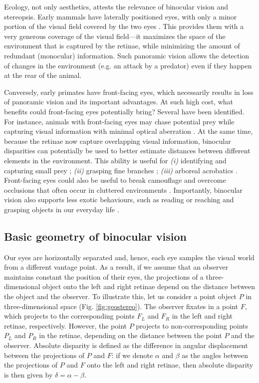 Ecology, not only aesthetics, attests the relevance of binocular vision and stereopsis. Early mammals have laterally positioned eyes, with only a minor portion of the visual field covered by the two eyes \cite{Allman:1999fk}. This provides them with a very generous coverage of the visual field---it maximizes the space of the environment that is captured by the retinae, while minimizing the amount of redundant (monocular) information. Such panoramic vision allows the detection of changes in the environment (e.g. an attack by a predator) even if they happen at the rear of the animal.

Conversely, early primates have front-facing eyes, which necessarily results in loss of panoramic vision and its important advantages. At such high cost, what benefits could front-facing eyes potentially bring? Several have been identified. For instance, animals with front-facing eyes may chase potential prey while capturing visual information with minimal optical aberration \cite{Allman:1999fk}. At the same time, because the retinae now capture overlapping visual information, binocular disparities can potentially be used to better estimate distances between different elements in the environment. This ability is useful for \textit{(i)} identifying and capturing small prey \cite{Cartmill:1992ys}; \textit{(ii)} grasping fine branches \cite{Martin:1990kx}; \textit{(iii)} arboreal acrobatics \cite{Clark:1934zr}. Front-facing eyes could also be useful to break camouflage \cite{Julesz:1971uq} and overcome occlusions that often occur in cluttered environments \cite{Changizi:2008ij}. Importantly, binocular vision also supports less exotic behaviours, such as reading \cite{Jainta:2014vn} or reaching and grasping objects in our everyday life \cite{Melmoth:2006ve}.

\subsection{Basic geometry of binocular vision}\label{sec:basic-geom-binoc}

Our eyes are horizontally separated and, hence, each eye samples the visual world from a different vantage point. As a result, if we assume that an observer maintains constant the position of their eyes, the projections of a three-dimensional object onto the left and right retinae depend on the distance between the object and the observer. To illustrate this, let us consider a point object $P$ in three-dimensional space (Fig. \ref{fig:geostereo}). The observer fixates in a point $F$, which projects to the corresponding points $F_{L}$ and $F_{R}$ in the left and right retinae, respectively. However, the point $P$ projects to non-corresponding points $P_{L}$ and $P_{R}$  in the retinae, depending on the distance between the point $P$ and the observer. Absolute disparity is defined as the difference in angular displacement between the projections of $P$ and $F$: if we denote $\alpha$ and $\beta$ as the angles between the projections of $P$ and $F$ onto the left and right retinae, then absolute disparity is then given by $\delta = \alpha - \beta$.

